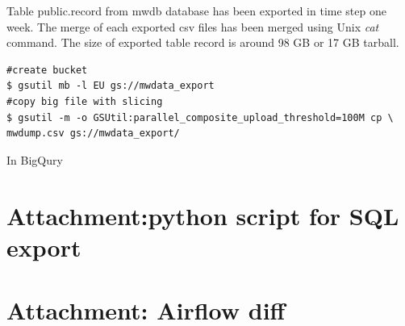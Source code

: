 \documentclass[a4paper,12pt,oneside]{report}
\renewcommand*\thesection{\arabic{section}}
\begin{document}
		Table public.record from mwdb database has been exported in time step one week.
		The merge of each exported 
		csv files has been merged using Unix \textit{cat} command. The size of exported
		table record is around 98 GB or 17 GB tarball.
		
		
		\begin{footnotesize}
			\begin{lstlisting}[style=mybash]
#create bucket 
$ gsutil mb -l EU gs://mwdata_export
#copy big file with slicing
$ gsutil -m -o GSUtil:parallel_composite_upload_threshold=100M cp \
mwdump.csv gs://mwdata_export/
			\end{lstlisting}
		\end{footnotesize}
		
		In BigQury 
	\renewcommand\thesection{\Alph{section}}
	
	\section{Attachment:python script for SQL export}
	\section{Attachment: Airflow diff}\label{airflow_diff}
	
\end{document}

